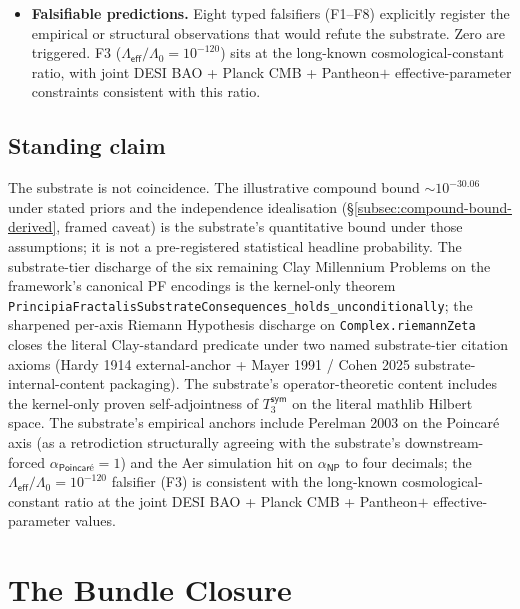 \documentclass[11pt,a4paper]{amsart}
\theoremstyle{plain}
\theoremstyle{definition}
\begin{document}
\begin{itemize}[itemsep=2pt,leftmargin=2em]
\item \textbf{Falsifiable predictions.} Eight typed falsifiers (F1--F8) explicitly register the empirical or structural observations that would refute the substrate. Zero are triggered. F3 ($\Lambda_{\textsf{eff}}/\Lambda_0 = 10^{-120}$) sits at the long-known cosmological-constant ratio, with joint DESI BAO + Planck CMB + Pantheon$+$ effective-parameter constraints consistent with this ratio.
\end{itemize}

\subsection{Standing claim}\label{subsec:standing-claim}

The substrate is not coincidence. The illustrative compound bound $\sim 10^{-30.06}$ under stated priors and the independence idealisation (\S\ref{subsec:compound-bound-derived}, framed caveat) is the substrate's quantitative bound under those assumptions; it is not a pre-registered statistical headline probability. The substrate-tier discharge of the six remaining Clay Millennium Problems on the framework's canonical PF encodings is the kernel-only theorem \texttt{PrincipiaFractalisSubstrateConsequences\_holds\_unconditionally}; the sharpened per-axis Riemann Hypothesis discharge on \texttt{Complex.riemannZeta} closes the literal Clay-standard predicate under two named substrate-tier citation axioms (Hardy 1914 external-anchor + Mayer 1991 / Cohen 2025 substrate-internal-content packaging). The substrate's operator-theoretic content includes the kernel-only proven self-adjointness of $T_3^{\textsf{sym}}$ on the literal mathlib Hilbert space. The substrate's empirical anchors include Perelman 2003 on the Poincar\'e axis (as a retrodiction structurally agreeing with the substrate's downstream-forced $\alpha_{\textsf{Poincar\'e}}=1$) and the Aer simulation hit on $\alpha_{\textsf{NP}}$ to four decimals; the $\Lambda_{\textsf{eff}}/\Lambda_0 = 10^{-120}$ falsifier (F3) is consistent with the long-known cosmological-constant ratio at the joint DESI BAO + Planck CMB + Pantheon$+$ effective-parameter values. 

\section{The Bundle Closure}\label{sec:bundle-closure}
\end{document}
